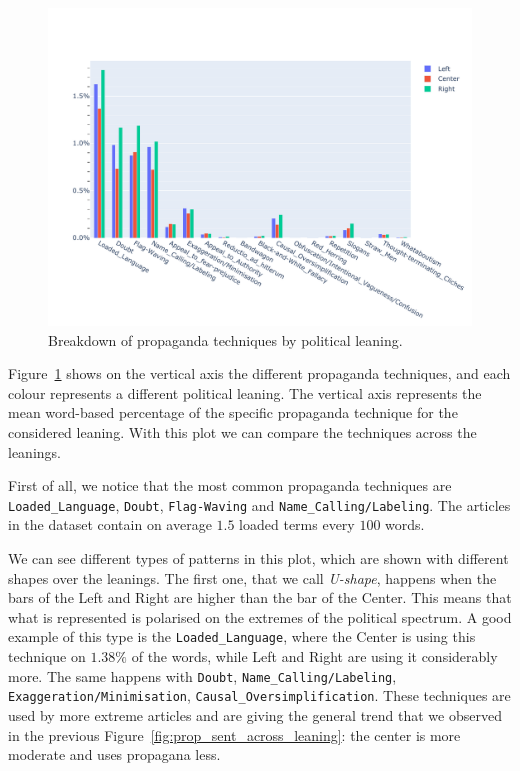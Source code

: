 \begin{figure}[!htbp]
    \centering
    \includegraphics[trim={0 0 0 2cm},clip,width=\linewidth]{figures/prop_tech_detail_across_leaning_baly.pdf}
    \caption{Breakdown of propaganda techniques by political leaning.}
    \label{fig:prop_tech_details_across_leaning}
\end{figure}

Figure~\ref{fig:prop_tech_details_across_leaning} shows on the vertical axis the different propaganda techniques, and each colour represents a different political leaning. The vertical axis represents the mean word-based percentage of the specific propaganda technique for the considered leaning.
With this plot we can compare the techniques across the leanings.

First of all, we notice that the most common propaganda techniques are \texttt{Loaded\_Language}, \texttt{Doubt}, \texttt{Flag-Waving} and \texttt{Name\_Calling/Labeling}.
The articles in the dataset contain on average $1.5$ loaded terms every $100$ words.

We can see different types of patterns in this plot, which are shown with different shapes over the leanings.
The first one, that we call \emph{U-shape}, happens when the bars of the Left and Right are higher than the bar of the Center. This means that what is represented is polarised on the extremes of the political spectrum.
A good example of this type is the \texttt{Loaded\_Language}, where the Center is using this technique on $1.38\%$ of the words, while Left and Right are using it considerably more.
The same happens with \texttt{Doubt}, \texttt{Name\_Calling/Labeling}, \texttt{Exaggeration/Minimisation}, \texttt{Causal\_Oversimplification}.
These techniques are used by more extreme articles and are giving the general trend that we observed in the previous Figure~\ref{fig:prop_sent_across_leaning}: the center is more moderate and uses propagana less.

